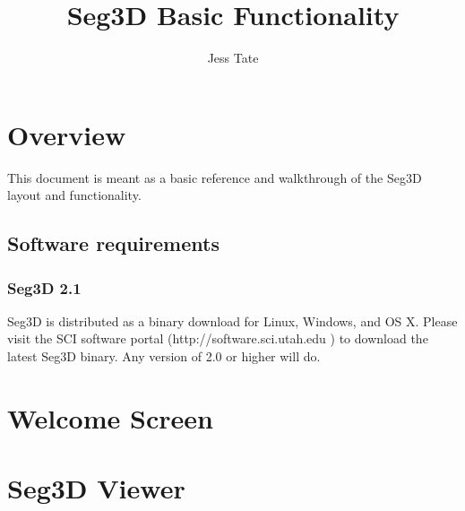 \documentclass[fleqn,11pt,openany]{book}
\title{Seg3D Basic Functionality}
\author{Jess Tate}
\begin{document}


\maketitle


\chapter{Overview}

\begin{introduction}

This document is meant as a basic reference and walkthrough of the Seg3D layout and functionality.  

\end{introduction}

\section{Software requirements}

\subsection{Seg3D 2.1}

Seg3D is distributed as a binary download for Linux, Windows, and OS X. Please visit the SCI software portal ({http://software.sci.utah.edu} ) to download the latest Seg3D binary. Any version of 2.0 or higher will do. 



\chapter{Welcome Screen}


\chapter{Seg3D Viewer}
\end{document}
